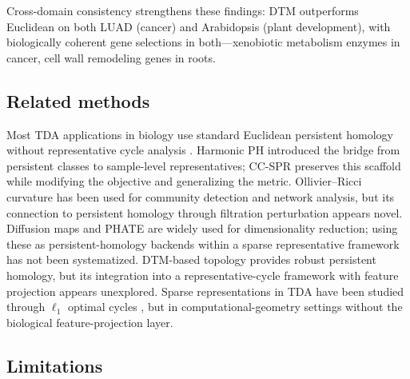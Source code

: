 \documentclass[12pt]{article}
\begin{document}
Cross-domain consistency strengthens these findings: DTM outperforms Euclidean on both LUAD (cancer) and Arabidopsis (plant development), with biologically coherent gene selections in both---xenobiotic metabolism enzymes in cancer, cell wall remodeling genes in roots.

\subsection{Related methods}

Most TDA applications in biology use standard Euclidean persistent homology without representative cycle analysis \cite{rizvi2017, xia2014, vipond2021, giusti2015, chan2013topology}.
Harmonic PH \cite{harmonicPH} introduced the bridge from persistent classes to sample-level representatives; CC-SPR preserves this scaffold while modifying the objective and generalizing the metric.
Ollivier--Ricci curvature \cite{ollivier2007, ollivier2009, ni2019community} has been used for community detection and network analysis, but its connection to persistent homology through filtration perturbation appears novel.
Diffusion maps \cite{coifman2006diffusion} and PHATE \cite{moon2019phate} are widely used for dimensionality reduction; using these as persistent-homology backends within a sparse representative framework has not been systematized.
DTM-based topology \cite{chazal2011dtm, chazal2017robust} provides robust persistent homology, but its integration into a representative-cycle framework with feature projection appears unexplored.
Sparse representations in TDA have been studied through $\ell_1$ optimal cycles \cite{chen2011hardness, dey2011optimal}, but in computational-geometry settings without the biological feature-projection layer.

\subsection{Limitations}
\end{document}
